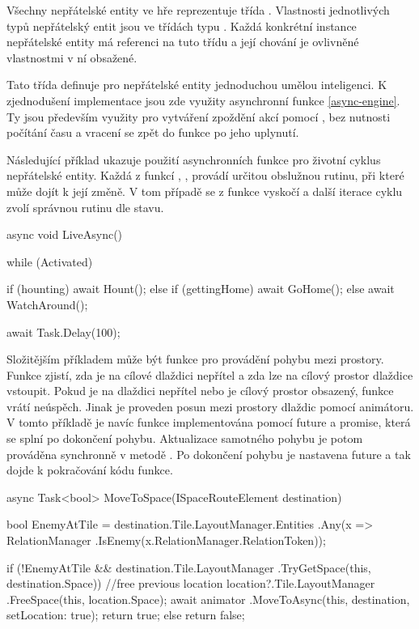 Všechny nepřátelské entity ve hře reprezentuje třída . Vlastnosti jednotlivých typů nepřátelský entit 
jsou ve třídách typu . Každá konkrétní instance 
nepřátelské entity má referenci na tuto třídu a její chování je ovlivněné vlastnostmi v ní obsažené. 

Tato třída definuje pro nepřátelské entity jednoduchou umělou inteligenci. K zjednodušení implementace jsou zde využity 
asynchronní funkce \vref{async-engine}. Ty jsou především využity pro vytváření zpoždění akcí pomocí 
, bez nutnosti počítání času a vracení se zpět do funkce po jeho uplynutí.

Následující příklad ukazuje použití asynchronních funkce pro životní cyklus nepřátelské entity.
Každá z funkcí , ,  provádí určitou obslužnou rutinu, při 
které může dojít k její změně. V tom případě se z funkce vyskočí a další iterace cyklu zvolí
správnou rutinu dle stavu.
\begin{code}
async void LiveAsync()
{
	while (Activated)
	{
		if (hounting)
			await Hount();
		else if (gettingHome)
			await GoHome();
		else
			await WatchAround();

		await Task.Delay(100);
	}
}
\end{code}


Složitějším příkladem může být funkce pro provádění pohybu mezi prostory. Funkce zjistí, zda je na cílové dlaždici nepřítel a
zda lze na cílový prostor dlaždice vstoupit. Pokud je na dlaždici nepřítel nebo je cílový prostor obsazený, funkce
vrátí neúspěch. Jinak je proveden posun mezi prostory dlaždic pomocí animátoru. V tomto příkladě
je navíc funkce  implementována pomocí future a promise, která se splní 
po dokončení pohybu. Aktualizace samotného pohybu je potom prováděna synchronně v metodě .
Po dokončení pohybu je nastavena future a tak dojde k pokračování kódu funkce.

\begin{code}
async Task<bool> MoveToSpace(ISpaceRouteElement destination)
{
   bool EnemyAtTile = destination.Tile.LayoutManager.Entities
      .Any(x => RelationManager
	     .IsEnemy(x.RelationManager.RelationToken));

   if (!EnemyAtTile && destination.Tile.LayoutManager
	     .TryGetSpace(this, destination.Space))
   {
      //free previous location
      location?.Tile.LayoutManager
         .FreeSpace(this, location.Space);
      await animator
	     .MoveToAsync(this, destination, setLocation: true);
      return true;
   } else { 
      return false;
   }
}
\end{code}

